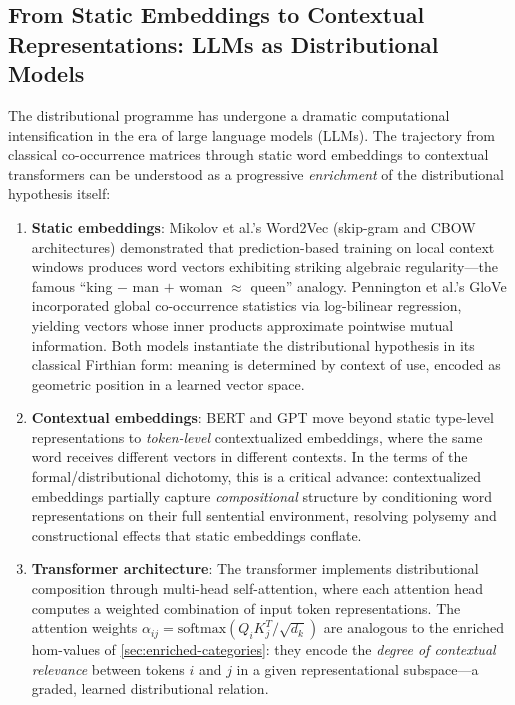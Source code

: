\documentclass[
]{article}
\numberwithin{equation}{section}
\begin{document}
\subsection{From Static Embeddings to Contextual Representations: LLMs
as Distributional
Models}\label{from-static-embeddings-to-contextual-representations-llms-as-distributional-models}

The distributional programme has undergone a dramatic computational
intensification in the era of large language models (LLMs). The
trajectory from classical co-occurrence matrices through static word
embeddings to contextual transformers can be understood as a progressive
\emph{enrichment} of the distributional hypothesis itself:

\begin{enumerate}
\def\labelenumi{\arabic{enumi}.}
\item
  \textbf{Static embeddings}: Mikolov et al.'s
  \citeyearpar{mikolov2013efficient} Word2Vec (skip-gram and CBOW
  architectures) demonstrated that prediction-based training on local
  context windows produces word vectors exhibiting striking algebraic
  regularity---the famous ``king \(-\) man \(+\) woman \(\approx\)
  queen'' analogy. Pennington et al.'s \citeyearpar{pennington2014glove}
  GloVe incorporated global co-occurrence statistics via log-bilinear
  regression, yielding vectors whose inner products approximate
  pointwise mutual information. Both models instantiate the
  distributional hypothesis in its classical Firthian form: meaning is
  determined by context of use, encoded as geometric position in a
  learned vector space.
\item
  \textbf{Contextual embeddings}: BERT \citep{devlin2019bert} and GPT
  \citep{radford2018improving} move beyond static type-level
  representations to \emph{token-level} contextualized embeddings, where
  the same word receives different vectors in different contexts. In the
  terms of the formal/distributional dichotomy, this is a critical
  advance: contextualized embeddings partially capture
  \emph{compositional} structure by conditioning word representations on
  their full sentential environment, resolving polysemy and
  constructional effects that static embeddings conflate.
\item
  \textbf{Transformer architecture}: The transformer
  \citep{vaswani2017attention} implements distributional composition
  through multi-head self-attention, where each attention head computes
  a weighted combination of input token representations. The attention
  weights \(\alpha_{ij} = \text{softmax}(Q_i K_j^T / \sqrt{d_k})\) are
  analogous to the enriched hom-values of
  \autoref{sec:enriched-categories}: they encode the \emph{degree of
  contextual relevance} between tokens \(i\) and \(j\) in a given
  representational subspace---a graded, learned distributional relation.
\end{enumerate}
\end{document}

